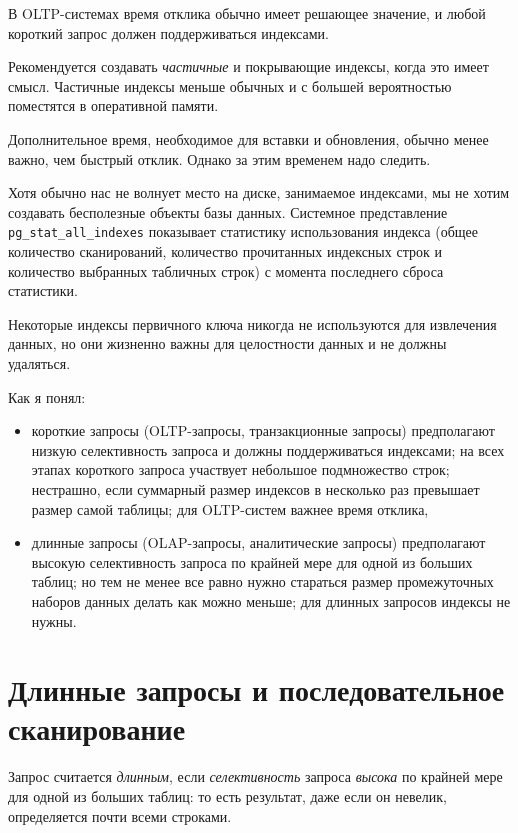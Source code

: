 \documentclass[%
	11pt,
	a4paper,
	utf8,
		]{article}
\begin{document}
В OLTP-системах время отклика обычно имеет решающее значение, и любой короткий запрос должен поддерживаться индексами.

Рекомендуется создавать \emph{частичные} и покрывающие индексы, когда это имеет смысл. Частичные индексы меньше обычных и с большей вероятностью поместятся в оперативной памяти.

Дополнительное время, необходимое для вставки и обновления, обычно менее важно, чем быстрый отклик. Однако за этим временем надо следить.

Хотя обычно нас не волнует место на диске, занимаемое индексами, мы не хотим создавать бесполезные объекты базы данных. Системное представление \verb|pg_stat_all_indexes| показывает статистику использования индекса (общее количество сканирований, количество прочитанных индексных строк и количество выбранных табличных строк) с момента последнего сброса статистики.

Некоторые индексы первичного ключа никогда не используются для извлечения данных, но они жизненно важны для целостности данных и не должны удаляться.


Как я понял:
\begin{itemize}
	\item короткие запросы (OLTP-запросы, транзакционные запросы) предполагают низкую селективность запроса и должны поддерживаться индексами; на всех этапах короткого запроса участвует небольшое подмножество строк; нестрашно, если суммарный размер индексов в несколько раз превышает размер самой таблицы; для OLTP-систем важнее время отклика,
	
	\item длинные запросы (OLAP-запросы, аналитические запросы) предполагают высокую селективность запроса по крайней мере для одной из больших таблиц; но тем не менее все равно нужно стараться размер промежуточных наборов данных делать как можно меньше; для длинных запросов индексы не нужны.
\end{itemize}

\section{Длинные запросы и последовательное сканирование}

Запрос считается \emph{длинным}, если \emph{селективность} запроса \emph{высока} по крайней мере для одной из больших таблиц: то есть результат, даже если он невелик, определяется почти всеми строками.
\end{document}
